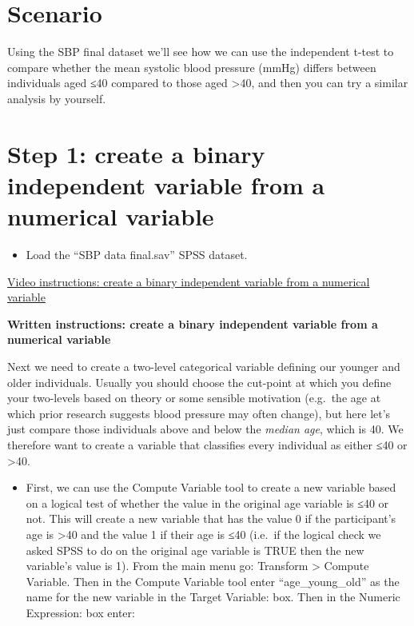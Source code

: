 \documentclass[
]{book}
\providecommand{\tightlist}{%
  \setlength{\itemsep}{0pt}\setlength{\parskip}{0pt}}
\begin{document}
\hypertarget{scenario-7}{%
\section{Scenario}\label{scenario-7}}

Using the SBP final dataset we'll see how we can use the independent t-test to compare whether the mean systolic blood pressure (mmHg) differs between individuals aged ≤40 compared to those aged \textgreater40, and then you can try a similar analysis by yourself.

\hypertarget{step-1-create-a-binary-independent-variable-from-a-numerical-variable}{%
\section{Step 1: create a binary independent variable from a numerical variable}\label{step-1-create-a-binary-independent-variable-from-a-numerical-variable}}

\begin{itemize}
\tightlist
\item
  Load the ``SBP data final.sav'' SPSS dataset.
\end{itemize}

\href{https://youtu.be/DPphng9PC4Q}{Video instructions: create a binary independent variable from a numerical variable}

\textbf{Written instructions: create a binary independent variable from a numerical variable}

Next we need to create a two-level categorical variable defining our younger and older individuals. Usually you should choose the cut-point at which you define your two-levels based on theory or some sensible motivation (e.g.~the age at which prior research suggests blood pressure may often change), but here let's just compare those individuals above and below the \emph{median age}, which is 40. We therefore want to create a variable that classifies every individual as either ≤40 or \textgreater40.

\begin{itemize}
\tightlist
\item
  First, we can use the Compute Variable tool to create a new variable based on a logical test of whether the value in the original age variable is ≤40 or not. This will create a new variable that has the value 0 if the participant's age is \textgreater40 and the value 1 if their age is ≤40 (i.e.~if the logical check we asked SPSS to do on the original age variable is TRUE then the new variable's value is 1). From the main menu go: Transform \textgreater{} Compute Variable. Then in the Compute Variable tool enter ``age\_young\_old'' as the name for the new variable in the Target Variable: box. Then in the Numeric Expression: box enter:
\end{itemize}
\end{document}
